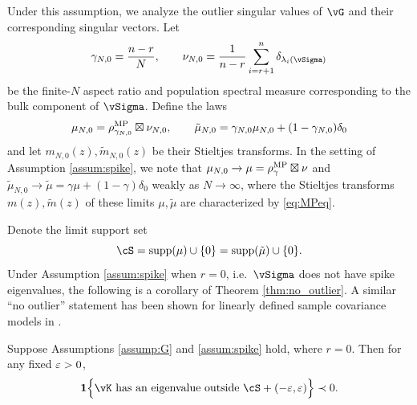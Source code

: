 Under this assumption, we analyze the outlier singular values of $\vG$ and their
corresponding singular vectors. Let
\[\gamma_{N,0}=\frac{n-r}{N}, \qquad \nu_{N,0}=\frac{1}{n-r}\sum_{i=r+1}^n
\delta_{\lambda_i(\vSigma)}\]
be the finite-$N$ aspect ratio and population spectral measure corresponding to
the bulk component of $\vSigma$. Define the laws
\[\mu_{N,0}=\rho_{\gamma_{N,0}}^{\textnormal{MP}} \boxtimes\nu_{N,0}, \qquad
\tilde \mu_{N,0}=\gamma_{N,0}\mu_{N,0}+(1-\gamma_{N,0})\delta_0\]
and let $m_{N,0}(z),\tilde m_{N,0}(z)$ be their Stieltjes transforms.
In the setting of Assumption \ref{assum:spike}, we note that
$\mu_{N,0} \to \mu=\rho_\gamma^{\textnormal{MP}} \boxtimes \nu$ and
$\tilde \mu_{N,0} \to \tilde \mu=\gamma \mu+(1-\gamma)\delta_0$ weakly as
$N \to \infty$, where the Stieltjes transforms $m(z),\tilde m(z)$ of these
limits $\mu,\tilde \mu$ are characterized by \eqref{eq:MPeq}.

Denote the limit support set
\begin{equation}\label{eq:limitsupport}
\cS=\supp{\mu} \cup \{0\}=\supp{\tilde \mu} \cup \{0\}.
\end{equation}
Under Assumption \ref{assum:spike} when $r=0$, i.e.\ $\vSigma$ does
not have spike eigenvalues, the following is a
corollary of Theorem \ref{thm:no_outlier}. A similar ``no outlier'' statement
has been shown for linearly defined sample covariance models in
\citep{bai1998no}.

\begin{coro}\label{cor:no_outlier}
Suppose Assumptions \ref{assump:G} and \ref{assum:spike} hold, where $r=0$.
Then for any fixed $\varepsilon>0$,
\begin{align*}
\bI\Big\{\vK \text{ has an eigenvalue outside }
\cS+(-\eps,\eps)\Big\} \prec 0.
\end{align*}
\end{coro}

